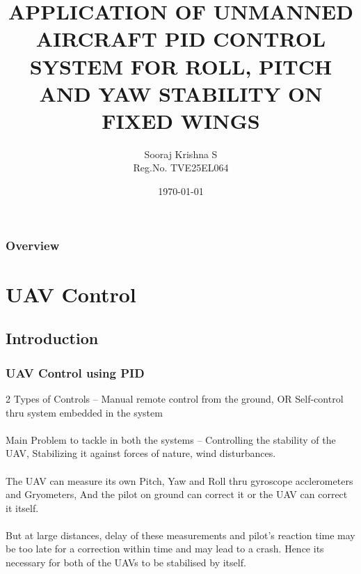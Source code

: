 \documentclass{beamer}
\title[PID in UAVs]{APPLICATION OF UNMANNED AIRCRAFT
PID CONTROL SYSTEM FOR ROLL, PITCH
AND YAW STABILITY ON FIXED WINGS}
\author[Sooraj Krishna S]{Sooraj Krishna S\\Reg.No. TVE25EL064}
\institute[CET] %
{
College of Engineering Trivandrum \\ %
}
\date{\today} %
\begin{document}
\begin{frame}
\titlepage %
\end{frame}

\begin{frame}
\frametitle{Overview} %
\tableofcontents %
\end{frame}

\section{UAV Control}

\subsection{Introduction}

\begin{frame}
\frametitle{UAV Control using PID}
2 Types of Controls – 
Manual remote control from the ground, OR Self-control thru system embedded in the system\\~\\
Main Problem to tackle in both the systems – Controlling the stability of the UAV, Stabilizing it against forces of nature, wind disturbances. \\~\\ 
The UAV can measure its own Pitch, Yaw and Roll thru gyroscope acclerometers and Gryometers, And the pilot on ground can correct it or the UAV can correct it itself.\\~\\
But at large distances, delay of these measurements and pilot’s reaction time may be too late for a correction within time and may lead to a crash. Hence its necessary for both of the UAVs to be stabilised by itself.

\end{frame}
\end{document}
